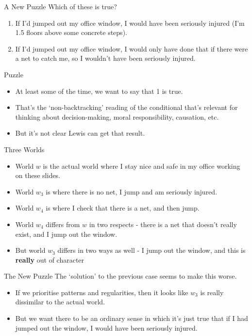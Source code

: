 \documentclass[
  ignorenonframetext,
]{beamer}
\providecommand{\tightlist}{%
  \setlength{\itemsep}{0pt}\setlength{\parskip}{0pt}}
\renewcommand{\,}{\text{, }}
\begin{document}
\begin{frame}{A New Puzzle}
\protect\hypertarget{a-new-puzzle}{}
Which of these is true?

\begin{enumerate}
\tightlist
\item
  If I'd jumped out my office window, I would have been seriously
  injured (I'm 1.5 floors above some concrete steps).
\item
  If I'd jumped out my office window, I would only have done that if
  there were a net to catch me, so I wouldn't have been seriously
  injured.
\end{enumerate}
\end{frame}

\begin{frame}{Puzzle}
\protect\hypertarget{puzzle}{}
\begin{itemize}
\tightlist
\item
  At least some of the time, we want to say that 1 is true.
\item
  That's the `non-backtracking' reading of the conditional that's
  relevant for thinking about decision-making, moral responsibility,
  causation, etc.
\item
  But it's not clear Lewis can get that result.
\end{itemize}
\end{frame}

\begin{frame}{Three Worlds}
\protect\hypertarget{three-worlds}{}
\begin{itemize}
\tightlist
\item
  World \(w\) is the actual world where I stay nice and safe in my
  office working on these slides.
\item
  World \(w_3\) is where there is no net, I jump and am seriously
  injured.
\item
  World \(w_4\) is where I check that there is a net, and then jump.
\item
  World \(w_4\) differs from \(w\) in two respects - there is a net that
  doesn't really exist, and I jump out the window.
\item
  But world \(w_3\) differs in two ways as well - I jump out the window,
  and this is \textbf{really} out of character
\end{itemize}
\end{frame}

\begin{frame}{The New Puzzle}
\protect\hypertarget{the-new-puzzle}{}
The `solution' to the previous case seems to make this worse.

\begin{itemize}
\tightlist
\item
  If we prioritise patterns and regularities, then it looks like \(w_3\)
  is really dissimilar to the actual world.
\item
  But we want there to be an ordinary sense in which it's just true that
  if I had jumped out the window, I would have been seriously injured.
\end{itemize}
\end{frame}
\end{document}
